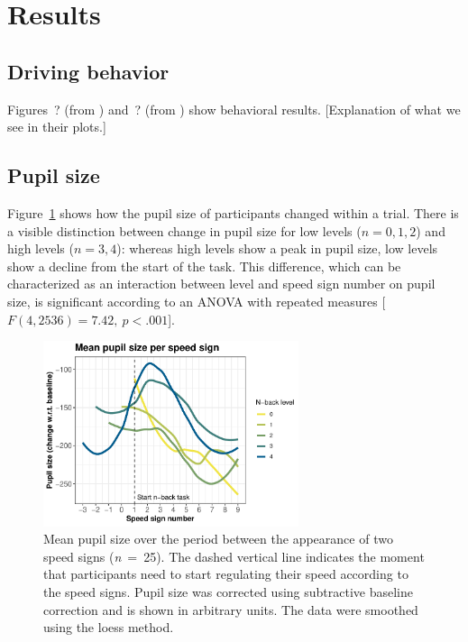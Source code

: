 
\section{Results}\label{sec:results}
\subsection{Driving behavior}
Figures~? (from \citet{DeMooij2021}) and~? (from \citet{Kelapanda2021}) show behavioral results.
[Explanation of what we see in their plots.]

\subsection{Pupil size}
Figure~\ref{fig:ps-speed-sign} shows how the pupil size of participants changed within a trial.
There is a visible distinction between change in pupil size for low \nback levels (\(n = 0,1,2\)) and high \nback levels (\(n = 3,4\)):
whereas high \nback levels show a peak in pupil size, low \nback levels show a decline from the start of the task.
This difference, which can be characterized as an interaction between \nback level and speed sign number on pupil size, is significant according to an ANOVA with repeated measures [\(F(4,2536)=7.42,\ p < .001\)].

\begin{figure}
  \centering
  \includegraphics[width=7.5cm]{images/speed_sign_nback.pdf}
  \caption{Mean pupil size over the period between the appearance of two speed signs (\textit{n}\ =\ 25).
  The dashed vertical line indicates the moment that participants need to start regulating their speed according to the speed signs.
  Pupil size was corrected using subtractive baseline correction and is shown in arbitrary units. 
  The data were smoothed using the loess method.}
  \label{fig:ps-speed-sign}
\end{figure}

